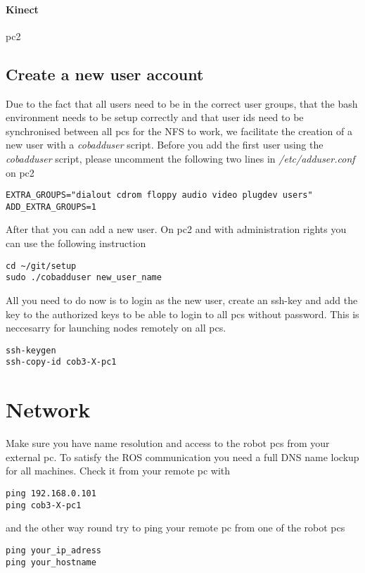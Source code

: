 \paragraph{Kinect}
pc2


\subsection{Create a new user account}
\label{sec:account}
Due to the fact that all users need to be in the correct user groups, that the bash environment needs to be setup correctly and that user ids need to be synchronised between all pcs for the NFS to work, we facilitate the creation of a new user with a \textit{cobadduser} script. Before you add the first user using the \textit{cobadduser} script, please uncomment the following two lines in \textit{/etc/adduser.conf} on pc2
\begin{lstlisting}
EXTRA_GROUPS="dialout cdrom floppy audio video plugdev users"
ADD_EXTRA_GROUPS=1
\end{lstlisting}

After that you can add a new user. On pc2 and with administration rights you can use the following instruction
\begin{lstlisting}
cd ~/git/setup
sudo ./cobadduser new_user_name
\end{lstlisting}

All you need to do now is to login as the new user, create an ssh-key and add the key to the authorized keys to be able to login to all pcs without password. This is neccesarry for launching nodes remotely on all pcs.
\begin{lstlisting}
ssh-keygen
ssh-copy-id cob3-X-pc1
\end{lstlisting}


\section{Network}
Make sure you have name resolution and access to the robot pcs from your external pc. To satisfy the ROS communication you need a full DNS name lockup for all machines. Check it from your remote pc with
\begin{lstlisting}
ping 192.168.0.101
ping cob3-X-pc1
\end{lstlisting}
and the other way round try to ping your remote pc from one of the robot pcs
\begin{lstlisting}
ping your_ip_adress
ping your_hostname
\end{lstlisting}

